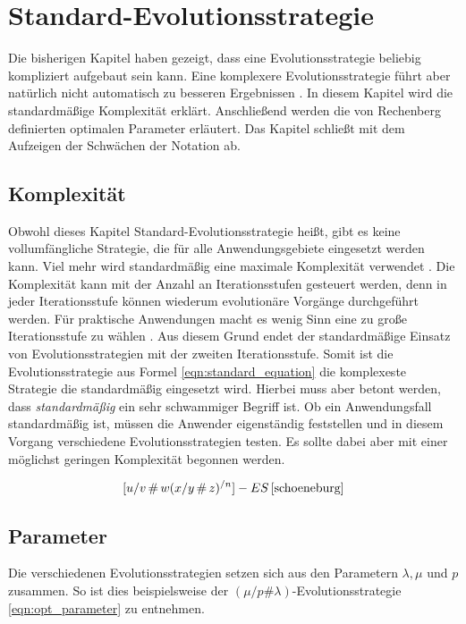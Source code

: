 
\section{Standard-Evolutionsstrategie}
Die bisherigen Kapitel haben gezeigt, dass eine Evolutionsstrategie beliebig kompliziert aufgebaut sein kann. Eine komplexere Evolutionsstrategie führt aber natürlich nicht automatisch zu besseren Ergebnissen \cite[S.165]{schoeneburg}.
In diesem Kapitel wird die standardmäßige Komplexität erklärt. Anschließend werden die von Rechenberg definierten optimalen Parameter erläutert. Das Kapitel schließt mit dem Aufzeigen der Schwächen der Notation ab.

\subsection{Komplexität}
Obwohl dieses Kapitel Standard-Evolutionsstrategie heißt, gibt es keine vollumfängliche Strategie, die für alle Anwendungsgebiete eingesetzt werden kann. Viel mehr wird standardmäßig eine maximale Komplexität verwendet \cite[S.165]{schoeneburg}.
Die Komplexität kann mit der Anzahl an Iterationsstufen gesteuert werden, denn in jeder Iterationsstufe können wiederum evolutionäre Vorgänge durchgeführt werden.
Für praktische Anwendungen macht es wenig Sinn eine zu große Iterationsstufe zu wählen \cite[S.165]{schoeneburg}. Aus diesem Grund endet der standardmäßige Einsatz von Evolutionsstrategien mit der zweiten Iterationsstufe.
Somit ist die Evolutionsstrategie aus Formel \ref{eqn:standard_equation} die komplexeste Strategie die standardmäßig eingesetzt wird. Hierbei muss aber betont werden, dass \textit{standardmäßig} ein sehr schwammiger Begriff ist. 
Ob ein Anwendungsfall standardmäßig ist, müssen die Anwender eigenständig feststellen und in diesem Vorgang verschiedene Evolutionsstrategien testen. Es sollte dabei aber mit einer möglichst geringen Komplexität begonnen werden.

\begin{equation}
\label{eqn:standard_equation}
[u/v\,\#\,w (x/y\,\#\,z)^{/n}]-ES\, \cite[S.165]{schoeneburg}
\end{equation}

\subsection{Parameter}
Die verschiedenen Evolutionsstrategien setzen sich aus den Parametern $\lambda, \mu$ und $p$ zusammen. So ist dies beispielsweise der $(\mu / p \# \lambda)$-Evolutionsstrategie \ref{eqn:opt_parameter} zu entnehmen.

